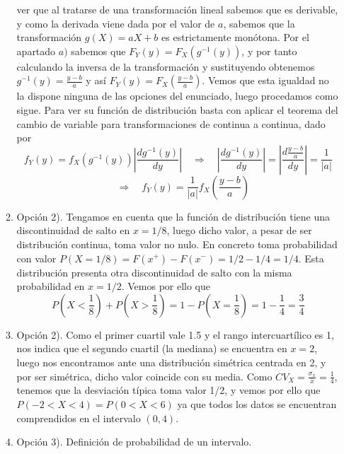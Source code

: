 \documentclass[fleqn]{article}
\def\next{\quad \Rightarrow \quad}
\begin{document}
\begin{enumerate}
\begin{enumerate}
                                        ver que al tratarse de una transformación lineal sabemos que es derivable, y como la derivada viene dada por el valor de $a$,
                                        sabemos que la transformación $g(X) = aX + b$ es estrictamente monótona. Por el apartado $a)$ sabemos que $F_Y(y) = F_X (g^{-1}(y))$,
                                        y por tanto calculando la inversa de la transformación y sustituyendo obtenemos $g^{-1}(y) = \frac{y-b}{a}$ y así
                                        $F_Y(y) = F_X (\frac{y-b}{a})$. Vemos que esta igualdad no la dispone ninguna de las opciones del enunciado, luego 
                                        procedamos como sigue. Para ver su función de distribución basta con aplicar el teorema del cambio de variable para
                                        transformaciones de continua a continua, dado por 
                                        $$ f_Y(y) = f_X(g^{-1}(y)) \left| \frac{d g^{-1}(y)}{dy} \right| \next 
                                        \left| \frac{d g^{-1}(y)}{dy} \right| = \left| \frac{d \frac{y-b}{a}}{dy} \right| = \frac{1}{|a|}$$
                                        $$ \next f_Y(y) = \frac{1}{|a|}f_X \left(\frac{y-b}{a}\right)$$
                                \item Opción 2). Tengamos en cuenta que la función de distribución tiene una discontinuidad de salto en $x=1/8$, luego dicho valor, a pesar 
                                        de ser distribución continua, toma valor no nulo. En concreto toma probabilidad con valor $P(X=1/8)= F(x^+)-F(x^-) = 1/2 - 1/4 = 1/4$.
                                        Esta distribución presenta otra discontinuidad de salto con la misma probabilidad en $x=1/2$. Vemos por ello que 
                                        $$P\left(X < \frac{1}{8}\right) + P\left(X > \frac{1}{8}\right) = 1 - P\left(X = \frac{1}{8}\right) = 1 - \frac{1}{4} = \frac{3}{4}$$
                                \item Opción 2). Como el primer cuartil vale 1.5 y el rango intercuartílico es 1, nos indica que el segundo cuartil (la mediana) se encuentra en 
                                        $x=2$, luego nos encontramos ante una distribución simétrica centrada en 2, y por ser simétrica, dicho valor coincide con su media.
                                        Como $CV_X = \frac{\sigma_x}{\bar{x}} = \frac{1}{4}$, tenemos que la desviación típica toma valor 1/2, y vemos por ello que 
                                        $P(-2 < X < 4) = P(0 < X < 6)$ ya que todos los datos se encuentran comprendidos en el intervalo $(0,4)$.
                                \item Opción 3). Definición de probabilidad de un intervalo.
                                

\end{enumerate}
\end{enumerate}
\end{document}
